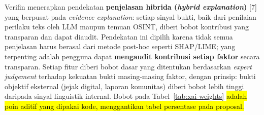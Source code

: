 \documentclass[12pt,a4paper]{article}
\newcommand{\revisi}[1]{\hl{#1}}
\newenvironment{sorotkuning}{%
  \begin{tcolorbox}[
    breakable,
    enhanced,
    frame hidden,
    boxrule=0pt,
    arc=0mm,
    sharp corners,
    colback=yellow!22,
    left=1.5mm, right=1.5mm, top=1.0mm, bottom=1.0mm,
    before skip=1.5pt, after skip=1.5pt
  ]%
}{%
  \end{tcolorbox}%
}
\begin{document}
\begin{sorotkuning}
Verifin menerapkan pendekatan \textbf{penjelasan hibrida (\textit{hybrid explanation})} [7] yang
berpusat pada \textit{evidence explanation}: setiap sinyal bukti, baik dari penilaian perilaku
teks oleh LLM maupun temuan OSINT, diberi bobot kontribusi yang transparan dan dapat diaudit. Pendekatan
ini dipilih karena tidak semua penjelasan harus berasal dari metode post-hoc seperti
SHAP/LIME; yang terpenting adalah pengguna dapat \textbf{mengaudit kontribusi setiap faktor}
secara transparan. Setiap fitur diberi bobot dasar yang ditentukan berdasarkan \textit{expert
judgement} terhadap kekuatan bukti masing-masing faktor, dengan prinsip: bukti objektif eksternal
(jejak digital, laporan komunitas) diberi bobot lebih tinggi daripada sinyal linguistik internal.
Bobot pada Tabel~\ref{tab:xai-weights} \revisi{adalah poin aditif yang dipakai kode, menggantikan
tabel persentase pada proposal.}


\end{sorotkuning}
\end{document}
